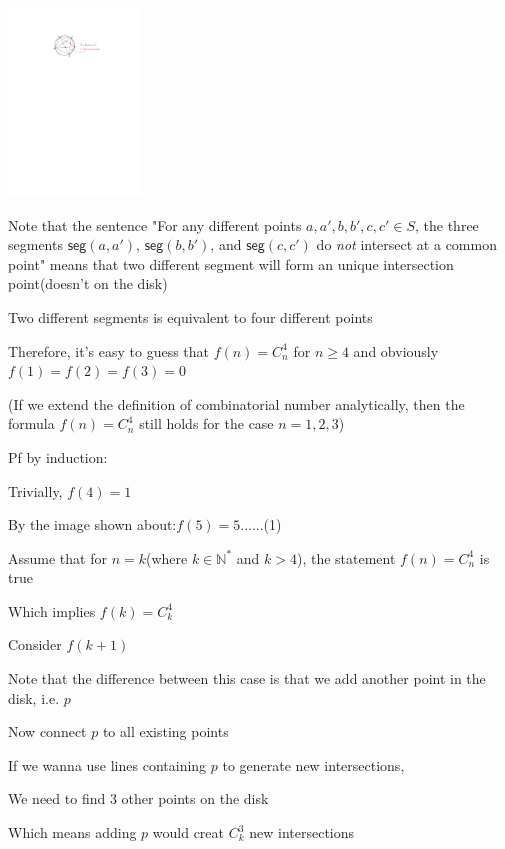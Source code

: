 \documentclass[11pt,twoside]{article}
\begin{document}
\begin{center}
    \includegraphics[height=5cm]{hw-fig-intersection.pdf}
\end{center}


\hspace*{\fill}

Note that the sentence "For any different points $a,a',b,b',c,c' \in S$, the three segments $\mathsf{seg}(a,a')$, $\mathsf{seg}(b,b')$, and $\mathsf{seg}(c,c')$ do \textit{not} intersect at a common point" means that two different segment will form an unique intersection point(doesn't on the disk)

Two different segments is equivalent to four different points

Therefore, it's easy to guess that $f(n) = C^4_n$ for $n\geq 4$ and obviously $f(1) =f(2) =f(3) =0$

(If we extend the definition of combinatorial number analytically, then the formula $f(n) = C^4_n$ still holds for the case $n=1,2,3$)

\hspace*{\fill}

Pf by induction:

Trivially, $f(4) = 1$

By the image shown about:$f(5)=5$......(1)

Assume that for $n = k$(where $k \in \mathbb{N^*} $ and $k>4$), the statement $f(n) = C^4_n$ is true

Which implies $f(k) = C^4_k$

Consider $f(k+1)$

Note that the difference between this case is that we add another point in the disk, i.e. $p$

Now connect $p$ to all existing points

If we wanna use lines containing $p$ to generate new intersections,

We need to find 3 other points on the disk

Which means adding $p$ would creat $C^3_k $ new intersections
\end{document}
